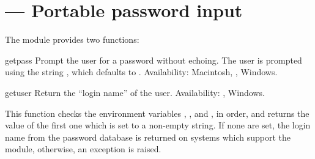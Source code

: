 \section{
         --- Portable password input}



The  module provides two functions:


\begin{funcdesc}{getpass}{}
  Prompt the user for a password without echoing.  The user is
  prompted using the string , which defaults to
  .
  Availability: Macintosh, \UNIX{}, Windows.
\end{funcdesc}


\begin{funcdesc}{getuser}{}
  Return the ``login name'' of the user.
  Availability: \UNIX{}, Windows.

  This function checks the environment variables ,
  ,  and , in order, and
  returns the value of the first one which is set to a non-empty
  string.  If none are set, the login name from the password database
  is returned on systems which support the  module,
  otherwise, an exception is raised.
\end{funcdesc}

